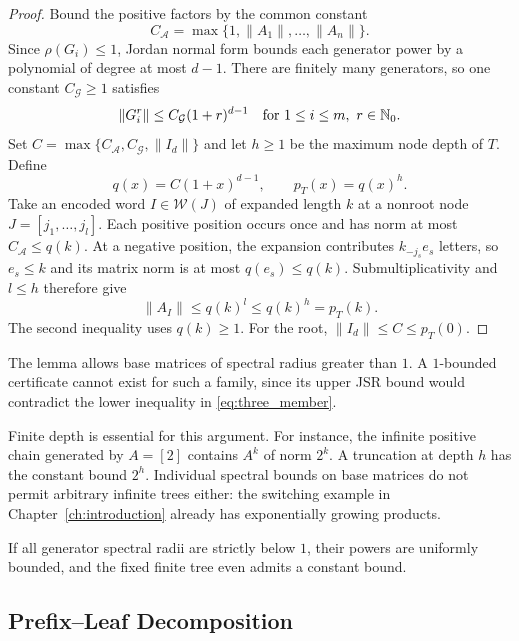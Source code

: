 \begin{proof}
    Bound the positive factors by the common constant
    \[
        C_{\mathcal{A}}=\max\{1,\lVert A_1\rVert,\dots,\lVert A_n\rVert\}.
    \]
    Since $\rho(G_i)\leq1$, Jordan normal form bounds each generator power by a polynomial of degree at most $d-1$.
    There are finitely many generators, so one constant $C_{\mathcal{G}}\geq1$ satisfies
    \[
        \lVert G_i^r\rVert\leq C_{\mathcal{G}}(1+r)^{d-1}
        \quad\text{for }1\leq i\leq m,\ r\in\mathbb{N}_0.
    \]
    Set $C=\max\{C_{\mathcal{A}},C_{\mathcal{G}},\lVert I_d\rVert\}$ and let $h\geq1$ be the maximum node depth of $T$.
    Define
    \[
        q(x)=C(1+x)^{d-1},\qquad p_T(x)=q(x)^h.
    \]
    Take an encoded word $I\in\mathcal{W}(J)$ of expanded length $k$ at a nonroot node $J=[j_1,\dots,j_l]$.
    Each positive position occurs once and has norm at most $C_{\mathcal{A}}\leq q(k)$.
    At a negative position, the expansion contributes $k_{-j_s}e_s$ letters, so $e_s\leq k$ and its matrix norm is at most $q(e_s)\leq q(k)$.
    Submultiplicativity and $l\leq h$ therefore give
    \[
        \lVert A_I\rVert\leq q(k)^l\leq q(k)^h=p_T(k).
    \]
    The second inequality uses $q(k)\geq1$.
    For the root, $\lVert I_d\rVert\leq C\leq p_T(0)$.
\end{proof}

\begin{remark}
    The lemma allows base matrices of spectral radius greater than $1$.
    A $1$-bounded certificate cannot exist for such a family, since its upper JSR bound would contradict the lower inequality in \eqref{eq:three_member}.
\end{remark}

\begin{remark}
    Finite depth is essential for this argument.
    For instance, the infinite positive chain generated by $A=[2]$ contains $A^k$ of norm $2^k$.
    A truncation at depth $h$ has the constant bound $2^h$.
    Individual spectral bounds on base matrices do not permit arbitrary infinite trees either: the switching example in Chapter~\ref{ch:introduction} already has exponentially growing products.
\end{remark}

\begin{remark}
    If all generator spectral radii are strictly below $1$, their powers are uniformly bounded, and the fixed finite tree even admits a constant bound.
\end{remark}

\subsection{Prefix--Leaf Decomposition}

